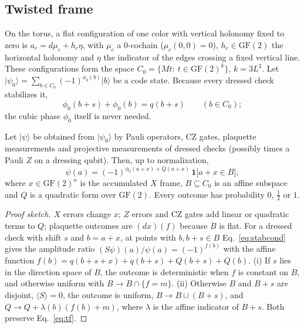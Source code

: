 \documentclass[a4paper]{article}
\newcommand{\GF}{\mathrm{GF}(2)}
\providecommand{\ket}[1]{\ensuremath{|#1\rangle}}
\begin{document}
\subsection{Twisted frame}
\label{sec:tf}

On the torus, a flat configuration of one color with vertical holonomy fixed to zero is $a_c=d\mu_c+h_c\eta$, with $\mu_c$ a 0-cochain ($\mu_c(0,0)=0$), $h_c\in\GF$ the horizontal holonomy and $\eta$ the indicator of the edges crossing a fixed vertical line. These configurations form the space $C_0=\{Mt:\ t\in\GF^k\}$, $k=3L^2$. Let $\ket{\psi_0}=\sum_{b\in C_0}(-1)^{\phi_0(b)}\ket{b}$ be a code state. Because every dressed check stabilizes it,
\begin{equation}
  \phi_0(b+s)+\phi_0(b)=q(b+s)\qquad(b\in C_0);
  \label{eq:stabcond}
\end{equation}
the cubic phase $\phi_0$ itself is never needed.

\begin{proposition}
Let $\ket{\psi}$ be obtained from $\ket{\psi_0}$ by Pauli operators, CZ gates, plaquette measurements and projective measurements of dressed checks (possibly times a Pauli $Z$ on a dressing qubit). Then, up to normalization,
\begin{equation}
  \psi(a)=(-1)^{\phi_0(a+x)+Q(a+x)}\,\mathbf{1}\big[a+x\in B\big],
  \label{eq:tf}
\end{equation}
where $x\in\GF^n$ is the accumulated $X$ frame, $B\subseteq C_0$ is an affine subspace and $Q$ is a quadratic form over $\GF$. Every outcome has probability $0$, $\tfrac12$ or $1$.
\end{proposition}

\begin{proof}[Proof sketch]
$X$ errors change $x$; $Z$ errors and CZ gates add linear or quadratic terms to $Q$; plaquette outcomes are $(dx)(f)$ because $B$ is flat. For a dressed check with shift $s$ and $b=a+x$, at points with $b,b+s\in B$ Eq.~\eqref{eq:stabcond} gives the amplitude ratio $(S\psi)(a)/\psi(a)=(-1)^{f(b)}$ with the affine function $f(b)=q(b+s+x)+q(b+s)+Q(b+s)+Q(b)$. (i) If $s$ lies in the direction space of $B$, the outcome is deterministic when $f$ is constant on $B$, and otherwise uniform with $B\to B\cap\{f=m\}$. (ii) Otherwise $B$ and $B+s$ are disjoint, $\langle S\rangle=0$, the outcome is uniform, $B\to B\cup(B+s)$, and $Q\to Q+\lambda(b)(f(b)+m)$, where $\lambda$ is the affine indicator of $B+s$. Both preserve Eq.~\eqref{eq:tf}.
\end{proof}
\end{document}
